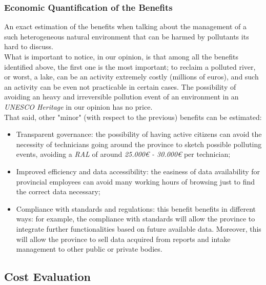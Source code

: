 \subsubsection{Economic Quantification of the Benefits}
An exact estimation of the benefits when talking about the management of a such heterogeneous natural environment that can be harmed by pollutants its hard to discuss. \\
What is important to notice, in our opinion, is that among all the benefits identified above, the first one is the most important; to reclaim a polluted river, or worst, a lake, can be an activity extremely costly (millions of euros), and such an activity can be even not practicable in certain cases. The possibility of avoiding an heavy and irreversible pollution event of an environment in an \textit{UNESCO Heritage} in our opinion has no price. \\
That said, other "minor" (with respect to the previous) benefits can be estimated:
\begin{itemize}
    \item Transparent governance: the possibility of having active citizens can avoid the necessity of technicians going around the province to sketch possible polluting events, avoiding a \textit{RAL} of around \textit{25.000€ - 30.000€} per technician;
    \item Improved efficiency and data accessibility: the easiness of data availability for provincial employees can avoid many working hours of browsing just to find the correct data necessary;
    \item Compliance with standards and regulations: this benefit benefits in different ways: for example, the compliance with standards will allow the province to integrate further functionalities based on future available data. Moreover, this will allow the province to sell data acquired from reports and intake management to other public or private bodies.
\end{itemize}

\subsection{Cost Evaluation}
